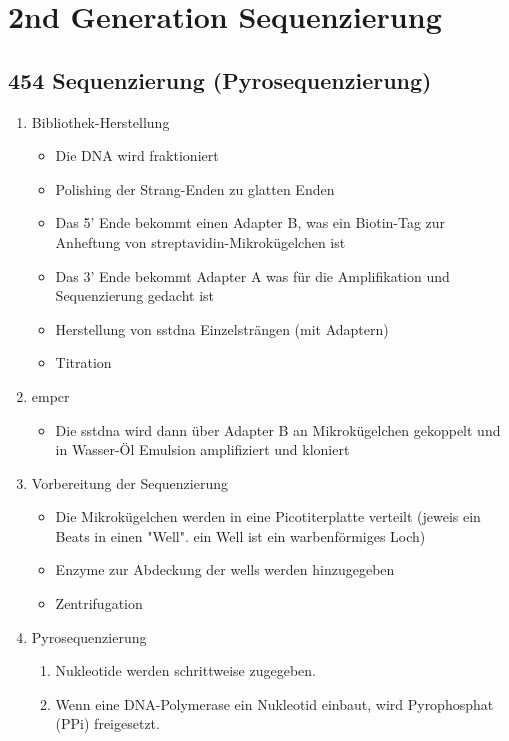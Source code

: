 \section{2nd Generation Sequenzierung} 
\subsection{454 Sequenzierung (Pyrosequenzierung)} 
\begin{enumerate}
    \item Bibliothek-Herstellung
    \begin{itemize}
        \item Die DNA wird fraktioniert 
        \item Polishing der Strang-Enden zu glatten Enden
        \item  Das 5' Ende bekommt einen Adapter B, was ein Biotin-Tag zur Anheftung von \gls{streptavidin}-Mikrokügelchen ist
        \item  Das 3' Ende bekommt Adapter A was für die Amplifikation und Sequenzierung gedacht ist
        \item Herstellung von \gls{sstdna} Einzelsträngen (mit Adaptern)
        \item Titration
    \end{itemize}
    \item \gls{empcr}
    \begin{itemize}
        \item Die \gls{sstdna} wird dann über Adapter B an Mikrokügelchen gekoppelt und in Wasser-Öl Emulsion amplifiziert und kloniert
    \end{itemize}
    \item Vorbereitung der Sequenzierung
    \begin{itemize}
        \item Die Mikrokügelchen werden in eine Picotiterplatte verteilt (jeweis ein Beats in einen "Well". ein Well ist ein warbenförmiges Loch)
        \item Enzyme zur Abdeckung der wells werden hinzugegeben
        \item Zentrifugation
    \end{itemize}
    \item Pyrosequenzierung 
    \begin{enumerate}
        \item Nukleotide werden schrittweise zugegeben.
        \item Wenn eine DNA-Polymerase ein Nukleotid einbaut, wird Pyrophosphat (PPi) freigesetzt.

\end{enumerate}
\end{enumerate}
